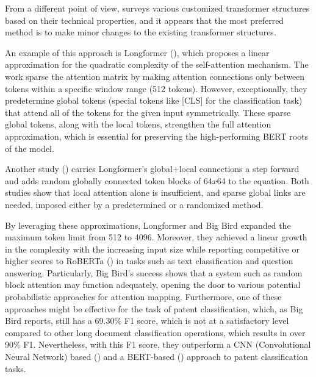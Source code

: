 \documentclass{iyte}
\begin{document}
From a different point of view, \cite{efficient_transformers_survey} surveys various customized transformer structures based on their technical properties, and it appears that the most preferred method is to make minor changes to the existing transformer structures.

An example of this approach is Longformer (\citealt{longformer}), which proposes a linear approximation for the quadratic complexity of the self-attention mechanism. The work sparse the attention matrix by making attention connections only between tokens within a specific window range (512 tokens). However, exceptionally, they predetermine global tokens (special tokens like [CLS] for the classification task) that attend all of the tokens for the given input symmetrically. These sparse global tokens, along with the local tokens, strengthen the full attention approximation, which is essential for preserving the high-performing BERT roots of the model.

Another study (\citealt{BigBird}) carries Longformer's global+local connections a step forward and adds random globally connected token blocks of 64$x$64 to the equation. Both studies show that local attention alone is insufficient, and sparse global links are needed, imposed either by a predetermined or a randomized method.

By leveraging these approximations, Longformer and Big Bird expanded the maximum token limit from 512 to 4096. Moreover, they achieved a linear growth in the complexity with the increasing input size while reporting competitive or higher scores to RoBERTa (\citealt{RoBERTa}) in tasks such as text classification and question answering. Particularly, Big Bird's success shows that a system such as random block attention may function adequately, opening the door to various potential probabilistic approaches for attention mapping. Furthermore, one of these approaches might be effective for the task of patent classification, which, as Big Bird reports, still has a 69.30\% F1 score, which is not at a satisfactory level compared to other long document classification operations, which results in over 90\% F1. Nevertheless, with this F1 score, they outperform a CNN (Convolutional Neural Network) based (\citealt{DeepPatent}) and a BERT-based (\citealt{Lee-BERT}) approach to patent classification tasks.
\end{document}
